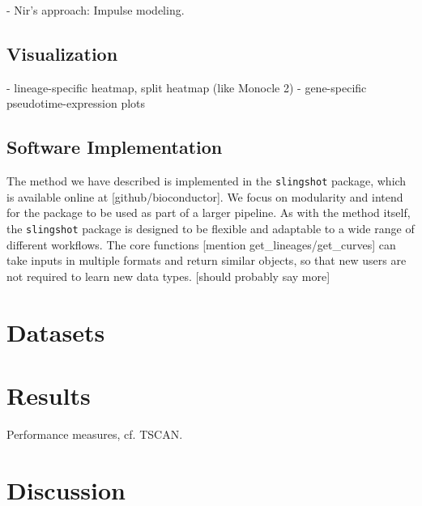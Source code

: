 \documentclass[11pt]{article}\usepackage[]{graphicx}\usepackage[]{color}
\begin{document}
- Nir's approach: Impulse modeling. 

\subsection{Visualization}
- lineage-specific heatmap, split heatmap (like Monocle 2)
- gene-specific pseudotime-expression plots


\subsection{Software Implementation}
The method we have described is implemented in the \texttt{slingshot} package, which is available online at [github/bioconductor]. We focus on modularity and intend for the package to be used as part of a larger pipeline. As with the method itself, the \texttt{slingshot} package is designed to be flexible and adaptable to a wide range of different workflows. The core functions [mention get\_lineages/get\_curves] can take inputs in multiple formats and return similar objects, so that new users are not required to learn new data types. [should probably say more]

\section{Datasets}

\section{Results}
Performance measures, cf. TSCAN.

\section{Discussion}
\end{document}
